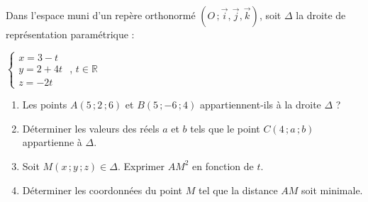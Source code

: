 \documentclass{cornouaille}
\begin{document}
  \begin{exercice}
    Dans l'espace muni d'un repère orthonormé
    $(O\,; \vec{i},\vec{j},\vec{k})$, soit $\Delta$ la droite de
    représentation paramétrique :

    \begin{center}
      $\begin{cases}x=3-t \\y=2+4t \\z=-2t \end{cases}$ ,
      $t\in\mathbb{R}$
    \end{center}

    \begin{enumerate}
    \item Les points $A(5\,;2\,;6)$ et $B(5\,;-6\,;4)$
      appartiennent-ils à la droite $\Delta$ ?
    \item Déterminer les valeurs des réels $a$ et $b$ tels que le
      point $C(4\,;a\,;b)$ appartienne à $\Delta$.
    \item Soit $M(x\,;y\,;z)\in \Delta$. Exprimer $AM^2$ en fonction
      de $t$.
    \item Déterminer les coordonnées du point $M$ tel que la distance
      $AM$ soit minimale.
    \end{enumerate}
  \end{exercice}
\end{document}
